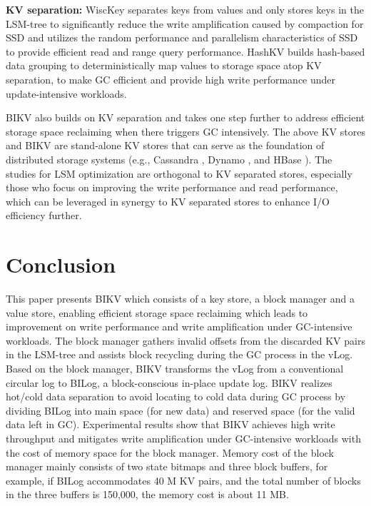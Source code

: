 \documentclass[sigconf]{acmart}
\begin{document}
\textbf{KV separation:} WiscKey \cite{Wisckey} separates keys from values and only stores keys in the LSM-tree to significantly reduce the write amplification caused by compaction for SSD and utilizes the random performance and parallelism characteristics of SSD to provide efficient read and range query performance. HashKV \cite{HashKV} builds hash-based data grouping to deterministically map values to storage space atop KV separation, to make GC efficient and provide high write performance under update-intensive workloads.

BIKV also builds on KV separation and takes one step further to address efficient storage space reclaiming when there triggers GC intensively. The above KV stores and BIKV are stand-alone KV stores that can serve as the foundation of distributed storage systems (e.g., Cassandra \cite{ Cassandra}, Dynamo \cite{ Dynamo}, and HBase \cite{HBase}). The studies for LSM optimization are orthogonal to KV separated stores, especially those who focus on improving the write performance and read performance, which can be leveraged in synergy to KV separated stores to enhance I/O efficiency further.

\section{Conclusion}
This paper presents BIKV which consists of a key store, a block manager and a value store, enabling efficient storage space reclaiming which leads to improvement on write performance and write amplification under GC-intensive workloads. The block manager gathers invalid offsets from the discarded KV pairs in the LSM-tree and assists block recycling during the GC process in the vLog. Based on the block manager, BIKV transforms the vLog from a conventional circular log to BILog, a block-conscious in-place update log. BIKV realizes hot/cold data separation to avoid locating to cold data during GC process by dividing BILog into main space (for new data) and reserved space (for the valid data left in GC). Experimental results show that BIKV achieves high write throughput and mitigates write amplification under GC-intensive workloads with the cost of memory space for the block manager. Memory cost of the block manager mainly consists of two state bitmaps and three block buffers, for example, if BILog accommodates 40 M KV pairs, and the total number of blocks in the three buffers is 150,000, the memory cost is about 11 MB.

\end{document}
